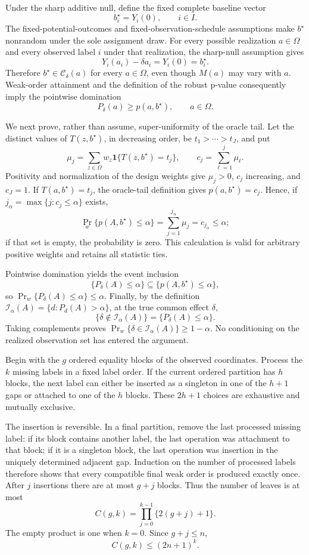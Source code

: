 Under the sharp additive null, define the fixed complete baseline vector
\[
b_i^\star=Y_i(0),\qquad i\in I.
\]
The fixed-potential-outcomes and fixed-observation-schedule assumptions make \(b^\star\) nonrandom under the sole assignment draw.  For every possible realization \(a\in\Omega\) and every observed label \(i\) under that realization, the sharp-null assumption gives
\[
Y_i(a_i)-\delta a_i=Y_i(0)=b_i^\star.
\]
Therefore \(b^\star\in\mathcal C_\delta(a)\) for every \(a\in\Omega\), even though \(M(a)\) may vary with \(a\).  Weak-order attainment and the definition of the robust p-value consequently imply the pointwise domination
\[
P_\delta(a)\ge p(a,b^\star),\qquad a\in\Omega.
\]

We next prove, rather than assume, super-uniformity of the oracle tail.  Let the distinct values of \(T(z,b^\star)\), in decreasing order, be \(t_1>\cdots>t_J\), and put
\[
\mu_j=\sum_{z\in\Omega}w_z\mathbf 1\{T(z,b^\star)=t_j\},
\qquad
c_j=\sum_{\ell=1}^j\mu_\ell.
\]
Positivity and normalization of the design weights give \(\mu_j>0\), \(c_j\) increasing, and \(c_J=1\).  If \(T(a,b^\star)=t_j\), the oracle-tail definition gives \(p(a,b^\star)=c_j\).  Hence, if \(j_\alpha=\max\{j:c_j\le\alpha\}\) exists,
\[
\Pr_w\{p(A,b^\star)\le\alpha\}
=\sum_{j=1}^{j_\alpha}\mu_j
=c_{j_\alpha}\le\alpha;
\]
if that set is empty, the probability is zero.  This calculation is valid for arbitrary positive weights and retains all statistic ties.

Pointwise domination yields the event inclusion
\[
\{P_\delta(A)\le\alpha\}
\subseteq
\{p(A,b^\star)\le\alpha\},
\]
so \(\Pr_w\{P_\delta(A)\le\alpha\}\le\alpha\).  Finally, by the definition \(\mathcal I_\alpha(A)=\{d:P_d(A)>\alpha\}\), at the true common effect \(\delta\),
\[
\{\delta\notin\mathcal I_\alpha(A)\}
=\{P_\delta(A)\le\alpha\}.
\]
Taking complements proves \(\Pr_w\{\delta\in\mathcal I_\alpha(A)\}\ge1-\alpha\).  No conditioning on the realized observation set has entered the argument.

Begin with the \(g\) ordered equality blocks of the observed coordinates.  Process the \(k\) missing labels in a fixed label order.  If the current ordered partition has \(h\) blocks, the next label can either be inserted as a singleton in one of the \(h+1\) gaps or attached to one of the \(h\) blocks.  These \(2h+1\) choices are exhaustive and mutually exclusive.

The insertion is reversible.  In a final partition, remove the last processed missing label: if its block contains another label, the last operation was attachment to that block; if it is a singleton block, the last operation was insertion in the uniquely determined adjacent gap.  Induction on the number of processed labels therefore shows that every compatible final weak order is produced exactly once.  After \(j\) insertions there are at most \(g+j\) blocks.  Thus the number of leaves is at most
\[
C(g,k)=\prod_{j=0}^{k-1}\{2(g+j)+1\}.
\]
The empty product is one when \(k=0\).  Since \(g+j\le n\),
\[
C(g,k)\le(2n+1)^k.
\]

